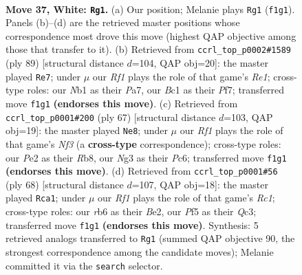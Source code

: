 \documentclass[11pt]{article}
\begin{document}
\clearpage

\begin{figure}[p]\centering
\begin{subfigure}{0.46\textwidth}\centering
\resizebox{\linewidth}{!}{%
\newchessgame
\chessboard[
  setfen={2b3k1/p1qn1r1p/1r3b2/2p2P2/Pp1p4/1P4N1/R3P1Q1/1NBK1R2 w - - 5 37},
  showmover=false,
  pgfstyle=straightmove, color=movearrow, markmove={f1-g1}
]}
\caption{}
\end{subfigure}\hfill
\begin{subfigure}{0.46\textwidth}\centering
\resizebox{\linewidth}{!}{%
\newchessgame
\chessboard[
  setfen={4r1k1/pq3pp1/1r3n2/2p4p/2P1p3/P1R3PP/2Q1PP1K/2BR4 b - - 1 45},
  showmover=false,
  pgfstyle=straightmove, color=movearrow, markmove={e8-e7}
]}
\caption{}
\end{subfigure}
\\[4pt]
\begin{subfigure}{0.46\textwidth}\centering
\resizebox{\linewidth}{!}{%
\newchessgame
\chessboard[
  setfen={1r3bk1/1q3p2/2p1rnpp/4p3/2R1P3/1P1RB2P/4QPP1/5NK1 b - - 1 34},
  showmover=false,
  pgfstyle=straightmove, color=movearrow, markmove={f6-e8}
]}
\caption{}
\end{subfigure}\hfill
\begin{subfigure}{0.46\textwidth}\centering
\resizebox{\linewidth}{!}{%
\newchessgame
\chessboard[
  setfen={r7/1p2r1pk/2p2qbp/P1Ppn3/R2N4/2Q3P1/4BPP1/2R3K1 w - - 13 35},
  showmover=false,
  pgfstyle=straightmove, color=movearrow, markmove={c1-a1}
]}
\caption{}
\end{subfigure}
\caption{\textbf{Move 37, White: \texttt{Rg1}.} (a) Our position; Melanie plays \texttt{Rg1} (\texttt{f1g1}). Panels (b)--(d) are the retrieved master positions whose correspondence most drove this move (highest QAP objective among those that transfer to it). (b) Retrieved from \texttt{ccrl\_top\_p0002\#1589} (ply 89) [structural distance $d$=104, QAP obj=20]: the master played \texttt{Re7}; under $\mu$ our \emph{Rf1} plays the role of that game's \emph{Re1}; cross-type roles: our \emph{N}b1 as their \emph{P}a7, our \emph{B}c1 as their \emph{P}f7; transferred move \texttt{f1g1} \textbf{(endorses this move)}. (c) Retrieved from \texttt{ccrl\_top\_p0001\#200} (ply 67) [structural distance $d$=103, QAP obj=19]: the master played \texttt{Ne8}; under $\mu$ our \emph{Rf1} plays the role of that game's \emph{Nf3} (a \textbf{cross-type} correspondence); cross-type roles: our \emph{P}e2 as their \emph{R}b8, our \emph{N}g3 as their \emph{P}c6; transferred move \texttt{f1g1} \textbf{(endorses this move)}. (d) Retrieved from \texttt{ccrl\_top\_p0001\#56} (ply 68) [structural distance $d$=107, QAP obj=18]: the master played \texttt{Rca1}; under $\mu$ our \emph{Rf1} plays the role of that game's \emph{Rc1}; cross-type roles: our \emph{r}b6 as their \emph{B}e2, our \emph{P}f5 as their \emph{Q}c3; transferred move \texttt{f1g1} \textbf{(endorses this move)}. Synthesis: 5 retrieved analogs transferred to \texttt{Rg1} (summed QAP objective 90, the strongest correspondence among the candidate moves); Melanie committed it via the \texttt{search} selector.}
\label{fig:thought-m72}
\end{figure}
\end{document}
